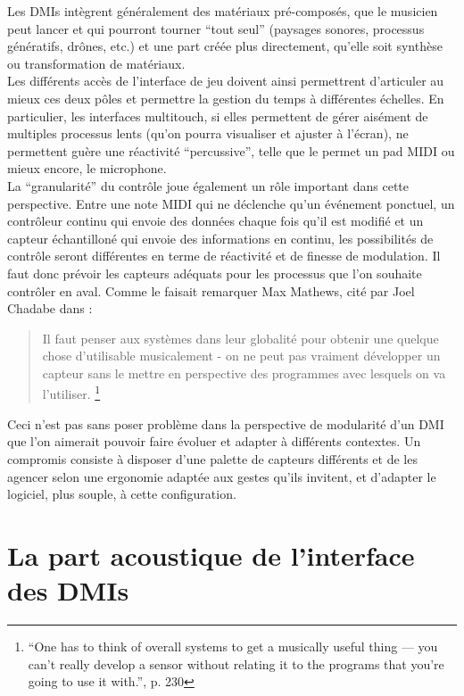 \noindent Les \glspl{DMI} intègrent généralement des matériaux pré-composés, que le musicien peut lancer et qui pourront tourner ``tout seul'' (paysages sonores, processus génératifs, drônes, etc.) et une part créée plus directement, qu'elle soit synthèse ou transformation de matériaux.\\
\indent Les différents accès de l'interface de jeu doivent ainsi permettrent d'articuler au mieux ces deux pôles et permettre la gestion du temps à différentes échelles. En particulier, les interfaces multitouch, si elles permettent de gérer aisément de multiples processus lents (qu'on pourra visualiser et ajuster à l'écran), ne permettent guère une réactivité ``percussive'', telle que le permet un pad \gls{MIDI} ou mieux encore, le microphone.\\
\indent La ``granularité'' du contrôle joue également un rôle important dans cette perspective. Entre une note \gls{MIDI} qui ne déclenche qu'un événement ponctuel, un contrôleur continu qui envoie des données chaque fois qu'il est modifié et un capteur échantilloné qui envoie des informations en continu, les possibilités de contrôle seront différentes en terme de réactivité et de finesse de modulation. Il faut donc prévoir les capteurs adéquats pour les processus que l'on souhaite contrôler en aval. Comme le faisait remarquer Max Mathews, cité par Joel Chadabe dans \cite{chadabe_electric_1996}:
\begin{quotation}
	Il faut penser aux systèmes dans leur globalité pour obtenir une quelque chose d'utilisable musicalement - on ne peut pas vraiment développer un capteur sans le mettre en perspective des programmes avec lesquels on va l'utiliser. \footnote{``One has to think of overall systems to get a musically useful thing — you can't really develop a sensor without relating it to the programs that you're going to use it with.'', p. 230}
\end{quotation}
\noindent Ceci n'est pas sans poser problème dans la perspective de modularité d'un \gls{DMI} que l'on aimerait pouvoir faire évoluer et adapter à différents contextes. Un compromis consiste à disposer d'une palette de capteurs différents et de les agencer selon une ergonomie adaptée aux gestes qu'ils invitent, et d'adapter le logiciel, plus souple, à cette configuration.

\section{La part acoustique de l'interface des DMIs}
\label{sec:interfaces:part_acoustique}

